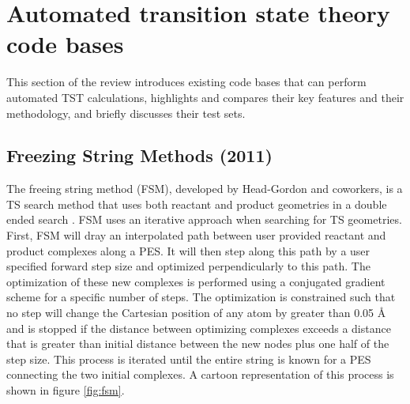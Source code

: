 \documentclass[preprint, 11pt]{elsarticle} %
\begin{document}


\section{Automated transition state theory code bases}

This section of the review introduces existing code bases that can perform automated TST calculations, highlights and compares their key features and their methodology, and briefly discusses their test sets.



\subsection{Freezing String Methods (2011)}

The freeing string method (FSM), developed by Head-Gordon and coworkers, is a TS search method that uses both reactant and product geometries in a double ended search \cite{}.
FSM uses an iterative approach when searching for TS geometries. 
First, FSM will dray an interpolated path between user provided reactant and product complexes along a PES.
It will then step along this path by a user specified forward step size and optimized perpendicularly to this path. 
The optimization of these new complexes is performed using a conjugated gradient scheme for a specific number of steps. 
The optimization is constrained such that no step will change the Cartesian position of any atom by greater than 0.05 \si{\angstrom} and is stopped if the distance between optimizing complexes exceeds a distance that is greater than initial distance between the new nodes plus one half of the step size. 
This process is iterated until the entire string is known for a PES connecting the two initial complexes. 
A cartoon representation of this process is shown in figure \ref{fig:fsm}. 
\end{document}
